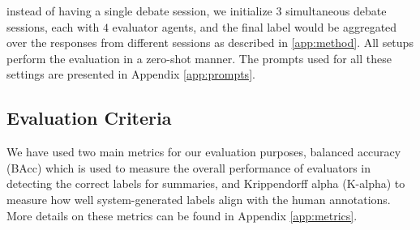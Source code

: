 instead of having a single debate session, we initialize $3$ simultaneous debate sessions, each with $4$ evaluator agents, and the final label would be aggregated over the responses from different sessions as described in \ref{app:method}.
% 
All setups perform the evaluation in a zero-shot manner.
The prompts used for all these settings are presented in Appendix \ref{app:prompts}.

\subsection{Evaluation Criteria}
We have used two main metrics for our evaluation purposes, balanced accuracy (BAcc) which is used to measure the overall performance of evaluators in detecting the correct labels for summaries, and Krippendorff alpha (K-alpha) \cite{krippendorff2011computing} to measure how well system-generated labels align with the human annotations. More details on these metrics can be found in Appendix \ref{app:metrics}.

